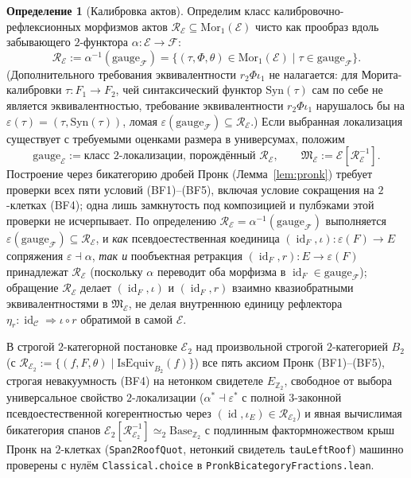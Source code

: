 \documentclass[11pt]{article}
\theoremstyle{plain}
\theoremstyle{definition}
\newtheorem{definition}[theorem]{Определение}
\newcommand{\cF}{\mathcal{F}}
\newcommand{\cC}{\mathcal{C}}
\newcommand{\fM}{\mathfrak{M}}
\newcommand{\Mor}{\mathrm{Mor}}
\newcommand{\Syn}{\mathrm{Syn}}
\newcommand{\cE}{\mathcal{E}}
\DeclareMathOperator{\id}{id}
\begin{document}
\begin{definition}[Калибровка актов]\label{def:gauge-E}
Определим класс калибровочно-рефлексионных морфизмов актов $\mathcal{R}_\cE \subseteq \Mor_1(\cE)$ чисто как прообраз вдоль забывающего $2$-функтора $\alpha : \cE \to \cF$:
\[
  \mathcal{R}_\cE := \alpha^{-1}(\mathrm{gauge}_\cF) = \bigl\{ (\tau, \Phi, \theta) \in \Mor_1(\cE) \;\big|\; \tau \in \mathrm{gauge}_\cF \bigr\}.
\]
(Дополнительного требования эквивалентности $r_2 \Phi \iota_1$ не налагается: для Морита-калибровки $\tau : F_1 \to F_2$, чей синтаксический функтор $\Syn(\tau)$ сам по себе не является эквивалентностью, требование эквивалентности $r_2 \Phi \iota_1$ нарушалось бы на $\varepsilon(\tau) = (\tau, \Syn(\tau))$, ломая $\varepsilon(\mathrm{gauge}_\cF) \subseteq \mathcal{R}_\cE$.) Если выбранная локализация существует с требуемыми оценками размера в универсумах, положим
\[ \mathrm{gauge}_\cE := \text{класс $2$-локализации, порождённый } \mathcal{R}_\cE, \qquad \fM_\cE := \cE[\mathcal{R}_\cE^{-1}]. \]
Построение через бикатегорию дробей Пронк (Лемма~\ref{lem:pronk}) требует проверки всех пяти условий (BF1)--(BF5), включая условие сокращения на $2$-клетках (BF4); одна лишь замкнутость под композицией и пулбэками этой проверки не исчерпывает. По определению $\mathcal{R}_\cE = \alpha^{-1}(\mathrm{gauge}_\cF)$ выполняется $\varepsilon(\mathrm{gauge}_\cF) \subseteq \mathcal{R}_\cE$, и \emph{как} псевдоестественная коединица $(\id_F, \iota) : \varepsilon(F) \to E$ сопряжения $\varepsilon \dashv \alpha$, \emph{так и} пообъектная ретракция $(\id_F, r) : E \to \varepsilon(F)$ принадлежат $\mathcal{R}_\cE$ (поскольку $\alpha$ переводит оба морфизма в $\id_F \in \mathrm{gauge}_\cF$); обращение $\mathcal{R}_\cE$ делает $(\id_F, \iota)$ и $(\id_F, r)$ взаимно квазиобратными эквивалентностями в $\fM_\cE$, не делая внутреннюю единицу рефлектора $\eta_r : \id_\cC \Rightarrow \iota \circ r$ обратимой в самой $\cE$.

В строгой $2$-категорной постановке $\cE_2$ над произвольной строгой $2$-категорией $B_2$ (с $\mathcal{R}_{\cE_2} := \{(f, F, \theta) \mid \mathrm{IsEquiv}_{B_2}(f)\}$) все пять аксиом Пронк (BF1)--(BF5), строгая невакуумность (BF4) на нетонком свидетеле $E_{\mathbb{Z}_2}$, свободное от выбора универсальное свойство $2$-локализации ($\alpha^* \dashv \varepsilon^*$ с полной $3$-законной псевдоестественной когерентностью через $(\id, \iota_E) \in \mathcal{R}_{\cE_2}$) и явная вычислимая бикатегория спанов $\cE_2[\mathcal{R}_{\cE_2}^{-1}] \simeq_2 \mathrm{Base}_{\mathbb{Z}_2}$ с подлинным фактормножеством крыш Пронк на $2$-клетках (\texttt{Span2RoofQuot}, нетонкий свидетель \texttt{tauLeftRoof}) машинно проверены с нулём \texttt{Classical.choice} в \texttt{PronkBicategoryFractions.lean}.
\end{definition}
\end{document}
